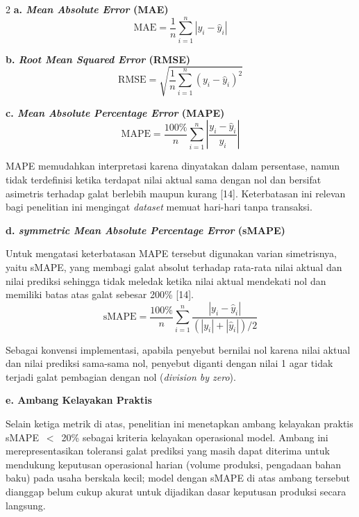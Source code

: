 \documentclass[12pt, a4paper, onecolumn, oneside]{report}
\begin{document}
\begin{spacing}{2}
\noindent\textbf{a. \textit{Mean Absolute Error} (MAE)}
\begin{equation}
    \text{MAE} = \frac{1}{n}\sum_{i=1}^{n} |y_i - \hat{y}_i|
    \label{eq:mae}
\end{equation}

\noindent\textbf{b. \textit{Root Mean Squared Error} (RMSE)}
\begin{equation}
    \text{RMSE} = \sqrt{\frac{1}{n}\sum_{i=1}^{n} (y_i - \hat{y}_i)^2}
    \label{eq:rmse}
\end{equation}

\noindent\textbf{c. \textit{Mean Absolute Percentage Error} (MAPE)}
\begin{equation}
    \text{MAPE} = \frac{100\%}{n}\sum_{i=1}^{n} \left| \frac{y_i - \hat{y}_i}{y_i} \right|
\end{equation}

MAPE memudahkan interpretasi karena dinyatakan dalam persentase, namun tidak terdefinisi ketika terdapat nilai aktual sama dengan nol dan bersifat asimetris terhadap galat berlebih maupun kurang [14]. Keterbatasan ini relevan bagi penelitian ini mengingat \textit{dataset} memuat hari-hari tanpa transaksi.

\noindent\textbf{d. \textit{symmetric Mean Absolute Percentage Error} (sMAPE)}

Untuk mengatasi keterbatasan MAPE tersebut digunakan varian simetrisnya, yaitu sMAPE, yang membagi galat absolut terhadap rata-rata nilai aktual dan nilai prediksi sehingga tidak meledak ketika nilai aktual mendekati nol dan memiliki batas atas galat sebesar 200\% [14].
\begin{equation}
    \text{sMAPE} = \frac{100\%}{n}\sum_{i=1}^{n} \frac{|y_i - \hat{y}_i|}{(|y_i| + |\hat{y}_i|)/2}
    \label{eq:smape}
\end{equation}

Sebagai konvensi implementasi, apabila penyebut bernilai nol karena nilai aktual dan nilai prediksi sama-sama nol, penyebut diganti dengan nilai 1 agar tidak terjadi galat pembagian dengan nol (\textit{division by zero}).

\noindent\textbf{e. Ambang Kelayakan Praktis}

Selain ketiga metrik di atas, penelitian ini menetapkan ambang kelayakan praktis sMAPE~$<$~20\% sebagai kriteria kelayakan operasional model. Ambang ini merepresentasikan toleransi galat prediksi yang masih dapat diterima untuk mendukung keputusan operasional harian (volume produksi, pengadaan bahan baku) pada usaha berskala kecil; model dengan sMAPE di atas ambang tersebut dianggap belum cukup akurat untuk dijadikan dasar keputusan produksi secara langsung.


\end{spacing}
\end{document}
